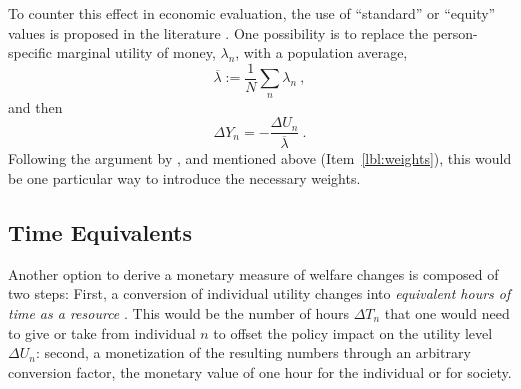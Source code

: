To counter this effect in economic evaluation, the use of ``standard'' or ``equity'' values is proposed in the literature \citep[see][for an overview of possible solutions]{RizziSteinmetz2015VOTIncomePreferenceEquity}.
%
One possibility is to replace the person-specific marginal utility of money, $\lambda_n$, with a population average,
\begin{equation}
\overline\lambda := \frac{1}{N} \sum_n \lambda_n \ ,
\label{eq:av-utl-of-income}
\end{equation}
and then
\begin{equation}
\Delta Y_n = - \frac{\Delta U_n}{\overline\lambda} \ .
\label{eq:using-av-utl-of-income}
\end{equation}
%
Following the argument by \cite{Fowkes2010ValueOfTTS}, \cite{OECD2006CBA} and \cite{GuehnemannEtAl2011MethodologyReportMCA} mentioned above (Item~\ref{lbl:weights}), this would be one particular way to introduce the necessary weights.



\subsection{Time Equivalents}
\label{ch:economicEval:aggregatingValues:time}


Another option to derive a monetary measure of welfare changes is composed of two steps:
%
First, a conversion of individual utility changes into \emph{equivalent hours of time as a resource} \citep{JaradiazEtc2008ValueOfLeisure, MackieJara-DiazFowkesTt-savings}. This would be the number of hours $\Delta T_n$ that one would need to give or take from individual $n$  to offset the policy impact on the utility level $\Delta U_n$: 
%
second, a monetization of the resulting numbers through an arbitrary conversion factor, \ie the monetary value of one hour for the individual or for society.

